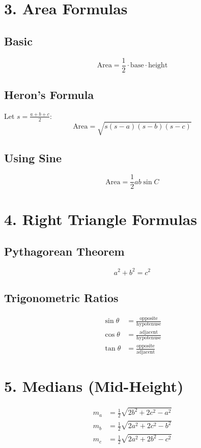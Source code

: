 \section*{3. Area Formulas}
\subsection*{Basic}
\[
\text{Area} = \frac{1}{2} \cdot \text{base} \cdot \text{height}
\]

\subsection*{Heron’s Formula}
Let \( s = \frac{a + b + c}{2} \):
\[
\text{Area} = \sqrt{s(s - a)(s - b)(s - c)}
\]

\subsection*{Using Sine}
\[
\text{Area} = \frac{1}{2} ab \sin C
\]

\section*{4. Right Triangle Formulas}
\subsection*{Pythagorean Theorem}
\[
a^2 + b^2 = c^2
\]

\subsection*{Trigonometric Ratios}
\begin{align*}
\sin \theta &= \frac{\text{opposite}}{\text{hypotenuse}} \\
\cos \theta &= \frac{\text{adjacent}}{\text{hypotenuse}} \\
\tan \theta &= \frac{\text{opposite}}{\text{adjacent}}
\end{align*}

\section*{5. Medians (Mid-Height)}
\begin{align*}
m_a &= \frac{1}{2} \sqrt{2b^2 + 2c^2 - a^2} \\
m_b &= \frac{1}{2} \sqrt{2a^2 + 2c^2 - b^2} \\
m_c &= \frac{1}{2} \sqrt{2a^2 + 2b^2 - c^2}
\end{align*}

